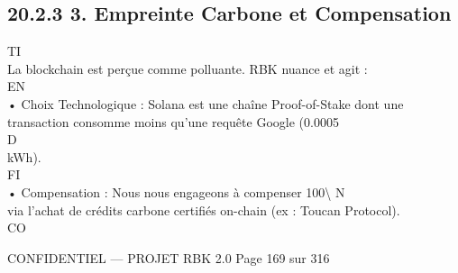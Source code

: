 \subsection{20.2.3 3. Empreinte Carbone et Compensation}
\vspace{0.5em}
\vspace{0.5em}
\vspace{0.5em}
\vspace{0.5em}
TI\\
La blockchain est perçue comme polluante. RBK nuance et agit :\\
\vspace{0.5em}
\vspace{0.5em}
\vspace{0.5em}
\vspace{0.5em}
EN\\
• Choix Technologique : Solana est une chaîne Proof-of-Stake dont une transaction consomme moins qu’une requête Google (0.0005\\
\vspace{0.5em}
\vspace{0.5em}
\vspace{0.5em}
\vspace{0.5em}
D\\
kWh).\\
\vspace{0.5em}
\vspace{0.5em}
\vspace{0.5em}
\vspace{0.5em}
FI\\
• Compensation : Nous nous engageons à compenser 100\textbackslash{}%
\vspace{0.5em}
N\\
via l’achat de crédits carbone certifiés on-chain (ex : Toucan Protocol).\\
CO\\
\vspace{0.5em}
\vspace{0.5em}
\vspace{0.5em}
\vspace{0.5em}
\begin{confidential}CONFIDENTIEL — PROJET RBK 2.0                                    Page 169 sur 316\end{confidential}
